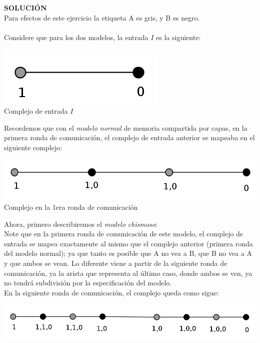 \documentclass{article}
\begin{document}
\begin{enumerate}
{\begin{enumerate}
\begin{enumerate}
        \textbf{SOLUCIÓN}\\
        Para efectos de este ejercicio la etiqueta A es gris, y B es negro.\\\\
        Considere que para los dos modelos, la entrada $I$ es la siguiente:\\
        \begin{center}
        \includegraphics[scale=1.15]{input1a.png}\\
        \scriptsize{Complejo de entrada $I$}\\
        \end{center}
        Recordemos que con el \textit{modelo normal} de memoria compartida por capas,
        en la primera ronda de comunicación, el complejo de entrada anterior se
        mapeaba en el siguiente complejo:
        \begin{center}
        \includegraphics[scale=0.95]{pronda1a.png}\\
        \scriptsize{Complejo en la 1era ronda de comunicación}\\
        \end{center}
        Ahora, primero describiremos el \textit{modelo chismoso}:\\
        Note que en la primera ronda de comunicación de este modelo, el complejo de
        entrada se mapea exactamente al mismo que el complejo anterior (primera ronda del
        modelo normal); ya que tanto es posible que A no vea a B, que B no vea a A y que
        ambos se vean.
        Lo diferente viene a partir de la siguiente ronda de comunicación, ya la arista que
        representa al último caso, donde ambos se ven, ya no tendrá subdivisión por la
        especificación del modelo.\\
        En la siguiente ronda de comunicación, el complejo queda como sigue:
        \begin{center}
        \includegraphics[scale=0.95]{srondachismoso1a.png}\\

\end{center}
\end{enumerate}
\end{enumerate}}
\end{enumerate}
\end{document}
